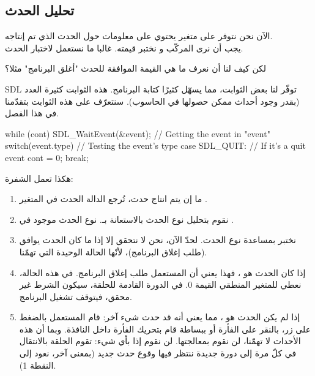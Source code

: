 \subsection{تحليل الحدث}

الآن نحن نتوفر على متغير
يحتوي على معلومات حول الحدث الذي تم إنتاجه.\\
يجب أن نرى المركّب
و نختبر قيمته. غالبا ما نستعمل
لاختبار الحدث.

\begin{question}
لكن كيف لنا أن نعرف ما هي القيمة الموافقة للحدث "أغلق البرنامج" مثلا؟
\end{question}

\textenglish{SDL}
توفّر لنا بعض الثوابت، مما يسهّل كثيرًا كتابة البرنامج. هذه الثوابت كثيرة العدد (بقدر وجود أحداث ممكن حصولها في الحاسوب). سنتعرّف على هذه الثوابت بتقدّمنا في هذا الفصل.

\begin{Csource}
while (cont)
{
	SDL_WaitEvent(&event); // Getting the event in "event"
	switch(event.type) // Testing the event's type
	{
		case SDL_QUIT: // If it's a quit event
		cont = 0;
		break;
	}
}
\end{Csource}

هكذا تعمل الشفرة:

\begin{enumerate}
	\item ما إن يتم انتاج حدث، تُرجع الدالة 
	الحدث في المتغير 
	.
	\item نقوم بتحليل نوع الحدث بالاستعانة بـ.
	نوع الحدث موجود في
	.
	\item نختبر بمساعدة 
	نوع الحدث. لحدّ الآن، نحن لا نتحقق إلا إذا ما كان الحدث يوافق
	(طلب إغلاق البرنامج)، لأنّها الحالة الوحيدة التي تهمّنا.
	\item إذا كان الحدث هو 
	،
	فهذا يعني أن المستعمل طلب إغلاق البرنامج. في هذه الحالة، نعطي للمتغير المنطقي
	القيمة 0. في الدورة القادمة للحلقة، سيكون الشرط غير محقق، فيتوقف تشغيل البرنامج.
	\item إذا لم يكن الحدث هو 
	،
	مما يعني أنه قد حدث شيء آخر: قام المستعمل بالضغط على زر، بالنقر على الفأرة أو ببساطة قام بتحريك الفأرة داخل النافذة. وبما أن هذه الأحداث لا تهمّنا، لن نقوم بمعالجتها. لن نقوم إذا بأي شيء: تقوم الحلقة بالانتقال في كلّ مرة إلى دورة جديدة ننتظر فيها وقوع حدث جديد (بمعنى آخر، نعود إلى النقطة 1).
\end{enumerate}

